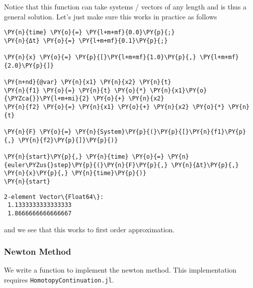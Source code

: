 \documentclass[11pt]{article}
\begin{document}
    Notice that this function can take systems / vectors of any length and
is thus a general solution. Let's just make sure this works in practice
as follows

    \begin{tcolorbox}[breakable, size=fbox, boxrule=1pt, pad at break*=1mm,colback=cellbackground, colframe=cellborder]
\begin{Verbatim}[commandchars=\\\{\}]
\PY{n}{time} \PY{o}{=} \PY{l+m+mf}{0.0}\PY{p}{;}
\PY{n}{Δt} \PY{o}{=} \PY{l+m+mf}{0.1}\PY{p}{;} 

\PY{n}{x} \PY{o}{=} \PY{p}{[}\PY{l+m+mf}{1.0}\PY{p}{,} \PY{l+m+mf}{2.0}\PY{p}{]}

\PY{n+nd}{@var} \PY{n}{x1} \PY{n}{x2} \PY{n}{t}
\PY{n}{f1} \PY{o}{=} \PY{n}{t} \PY{o}{*} \PY{n}{x1}\PY{o}{\PYZca{}}\PY{l+m+mi}{2} \PY{o}{+} \PY{n}{x2}
\PY{n}{f2} \PY{o}{=} \PY{n}{x1} \PY{o}{+} \PY{n}{x2} \PY{o}{*} \PY{n}{t}

\PY{n}{F} \PY{o}{=} \PY{n}{System}\PY{p}{(}\PY{p}{[}\PY{n}{f1}\PY{p}{,} \PY{n}{f2}\PY{p}{]}\PY{p}{)}

\PY{n}{start}\PY{p}{,} \PY{n}{time} \PY{o}{=} \PY{n}{euler\PYZus{}step}\PY{p}{(}\PY{n}{F}\PY{p}{,} \PY{n}{Δt}\PY{p}{,} \PY{n}{x}\PY{p}{,} \PY{n}{time}\PY{p}{)}
\PY{n}{start}
\end{Verbatim}
\end{tcolorbox}

            \begin{tcolorbox}[breakable, size=fbox, boxrule=.5pt, pad at break*=1mm, opacityfill=0]
\begin{Verbatim}[commandchars=\\\{\}]
2-element Vector\{Float64\}:
 1.1333333333333333
 1.8666666666666667
\end{Verbatim}
\end{tcolorbox}
        
    and we see that this works to first order approximation.

    \hypertarget{newton-method}{%
\subsubsection{Newton Method}\label{newton-method}}

We write a function to implement the newton method. This implementation
requires \texttt{HomotopyContinuation.jl}.
\end{document}
